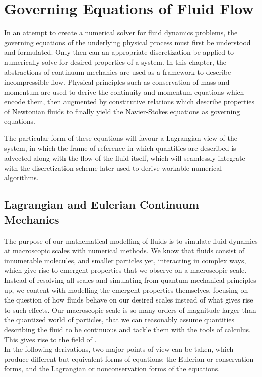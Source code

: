 \chapter{Governing Equations of Fluid Flow}\label{chp:governing-equations}
In an attempt to create a numerical solver for fluid dynamics problems, the governing equations of the underlying physical process must first be understood and formulated. Only then can an appropriate discretization be applied to numerically solve for desired properties of a system. In this chapter, the abstractions of continuum mechanics are used as a framework to describe incompressible flow. Physical principles such as conservation of mass and momentum are used to derive the continuity and momentum equations which encode them, then augmented by constitutive relations which describe properties of Newtonian fluids to finally yield the Navier-Stokes equations as governing equations.
\autocite*{anderson}\autocite*{tutorial}

The particular form of these equations will favour a Lagrangian view of the system, in which the frame of reference in which quantities are described is advected along with the flow of the fluid itself, which will seamlessly integrate with the discretization scheme later used to derive workable numerical algorithms.



\section{Lagrangian and Eulerian Continuum Mechanics}
The purpose of our mathematical modelling of fluids is to simulate fluid dynamics at macroscopic scales with numerical methods. We know that fluids consist of innumerable molecules, and smaller particles yet, interacting in complex ways, which give rise to emergent properties that we observe on a macroscopic scale. Instead of resolving all scales and simulating from quantum mechanical principles up, we content with modelling the emergent properties themselves, focusing on the question of how fluids behave on our desired scales instead of what gives rise to such effects. Our macroscopic scale is so many orders of magnitude larger than the quantized world of particles, that we can reasonably assume quantities describing the fluid to be continuous and tackle them with the tools of calculus. This gives rise to the field of .\\
In the following derivations, two major points of view can be taken, which produce different but equivalent forms of equations: the Eulerian or conservation forms, and the Lagrangian or nonconservation forms of the equations\autocite*{anderson}.

